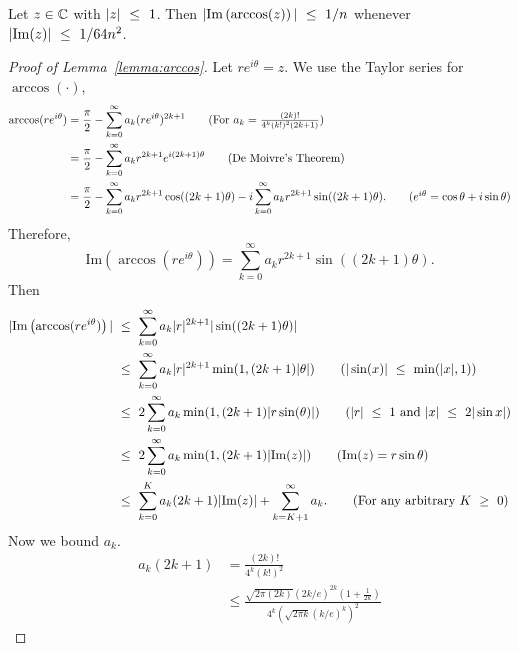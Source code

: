 \begin{lemma}
\label{lemma:arccos}
    Let $z \in \mathbb{C}$ with $|z| ~\le~ 1$. Then $| \mathrm{Im} \left( \arccos(z) \right) | ~\le~ 1/n$ whenever $|\mathrm{Im}(z)| ~\le~ 1/64n^2$.
\end{lemma}
\begin{proof}[Proof of Lemma~\ref{lemma:arccos}]
    Let $re^{i \theta} = z$. We use the Taylor series for $\arccos(\cdot)$,
    \begin{align*}
        \arccos(re^{i \theta}) & = \frac{\pi}{2} - \sum_{k = 0}^{\infty} a_k (re^{i \theta})^{2k + 1} \tag{For $a_k = \frac{(2k)!}{4^k (k!)^2 (2k + 1)}$} \\
        & = \frac{\pi}{2} - \sum_{k = 0}^{\infty} a_k r^{2k + 1} e^{i (2k + 1) \theta} \tag{De Moivre's Theorem}\\
        & = \frac{\pi}{2} - \sum_{k = 0}^{\infty} a_k r^{2k + 1}  \cos ( (2k + 1) \theta)  - i \sum_{k = 0}^{\infty} a_k r^{2k + 1} \sin( (2k + 1) \theta). \tag{$e^{i \theta} = \cos \theta + i \sin \theta$} 
    \end{align*}
    Therefore,
    \begin{equation*}
         \mathrm{Im} \left( \arccos(re^{i \theta}) \right)  = \sum_{k = 0}^{\infty} a_k r^{2k + 1} \sin( (2k + 1) \theta).
    \end{equation*}
    Then
    \begin{align*}
         \abs{ \mathrm{Im} \left( \arccos(re^{i \theta}) \right)  } & \leq \sum_{k = 0}^{\infty} a_k  \abs{r}^{2k+1} \abs{ \sin( (2k + 1) \theta)}  \\
         & \leq \sum_{k = 0}^{\infty} a_k \abs{r}^{2k+1} \min (1, (2k + 1) \abs{ \theta} ) \tag{$\abs{\sin(x)} \leq \min (\abs{x}, 1)$} \\
          & \leq 2 \sum_{k = 0}^{\infty} a_k  \min (1, (2k + 1) \abs{r \sin (\theta) }  ) \tag{$\abs{r} \leq 1$ and $\abs{x} \leq 2 \abs{\sin{x}}$} \\
           & \leq 2 \sum_{k = 0}^{\infty} a_k  \min (1, (2k + 1) \abs{\mathrm{Im}(z) }  ) \tag{$ \mathrm{Im}(z) = r \sin \theta$} \\
         & \leq \sum_{k = 0}^{K} a_k (2k+1) \abs{\mathrm{Im}(z)} + \sum_{k = K+1}^{\infty} a_k  . \tag{For any arbitrary $K \geq 0$}
    \end{align*}
    Now we bound $a_k$.
\begin{align*}
    a_k (2k + 1)& = \frac{(2k)!}{4^k (k!)^2} \\
    & \leq \frac{\sqrt{2 \pi (2k)} (2k/e)^{2k} \left( 1 + \frac{1}{2k} \right)}{4^k \left( \sqrt{2 \pi k} (k/e)^k \right)^2 } \tag{Stirling's Formula }%

\end{align*}
\end{proof}
